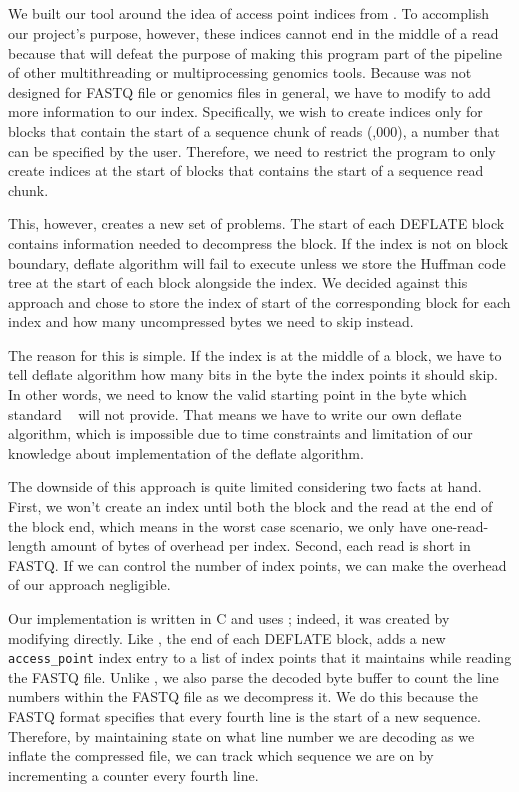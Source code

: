 \subsection{\ibuilder}
\label{sec:ibuilder}
We built our \ibuilder tool around the idea of access point indices from \zran.
To accomplish our project's purpose, however,
these indices cannot end in the middle of a read because
that will defeat the purpose of making this program part of the pipeline of
other multithreading or multiprocessing genomics tools. Because \zran was
not designed for FASTQ file or genomics files in general, we have to modify
\zran to add more information to our index. Specifically, we wish to create
indices only for \gzip blocks that contain the start of a sequence chunk of
reads (,000), a number that can be specified by the user. Therefore, we
need to restrict the program to only create indices at the start of blocks
that contains the start of a sequence read chunk.

This, however, creates a new set of problems. The start of each DEFLATE block
contains information needed to decompress the block. If the index is not on
block boundary, deflate algorithm will fail to execute unless we store the
Huffman code tree at the start of each block alongside the index. We decided
against this approach and chose to store the index of start of the corresponding
block for each index and how many uncompressed bytes we need to skip instead. 

The reason for this is simple. If the index is at the middle of a block, we have to tell deflate algorithm how many bits in the byte the index points it should skip. In other words, we need to know the valid starting point in the byte which standard \zlib~\cite{zlib} will not provide. That means we have to write our own deflate algorithm, which is impossible due to time constraints and limitation of our knowledge about implementation of the deflate algorithm. 

The downside of this approach is quite limited considering two facts at hand.
First, we won't create an index until both the block and the read at the end of
the block end, which means in the worst case scenario, we only have
one-read-length amount of bytes of overhead per index. Second, each read is
short in FASTQ. If we can control the number of index points, we can make the
overhead of our approach negligible.  

Our \ibuilder implementation is written in C and uses \zlib; indeed, it was
created by modifying \zran directly. Like \zran, the end of each DEFLATE block,
\ibuilder adds a new \texttt{access\_point} index entry to a list of index
points that it maintains while reading the \gzip FASTQ file. Unlike \zran, we
also parse the decoded byte buffer to count the line numbers within the FASTQ
file as we decompress it. We do this because the FASTQ format specifies that
every fourth line is the start of a new sequence. Therefore, by maintaining
state on what line number we are decoding as we inflate the compressed file, we can
track which sequence we are on by incrementing a counter every fourth line. 

